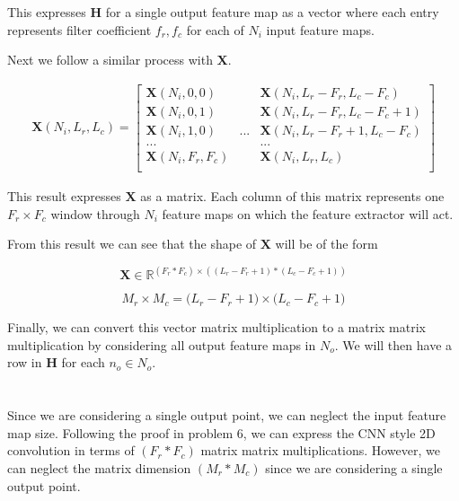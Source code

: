 \documentclass[12pt]{article}
\begin{document}
This expresses $\boldsymbol{H}$ for a single output feature map as a vector
where each entry represents filter coefficient $f_r, f_c$ for each of $N_i$
input feature maps.
\newline

Next we follow a similar process with $\boldsymbol{X}$.

\begin{align}
	\boldsymbol{X}(N_i, L_r, L_c) =
	\begin{bmatrix}
		\boldsymbol{X}(N_i, 0, 0) && \boldsymbol{X}(N_i, L_r-F_r, L_c-F_c) \\
		\boldsymbol{X}(N_i, 0, 1) && \boldsymbol{X}(N_i, L_r-F_r, L_c-F_c+1)\\
		\boldsymbol{X}(N_i, 1, 0) &...& \boldsymbol{X}(N_i, L_r-F_r+1, L_c-F_c)\\
		... && ... \\
		\boldsymbol{X}(N_i, F_r, F_c) && \boldsymbol{X}(N_i, L_r, L_c)\\
	\end{bmatrix}
\end{align}

This result expresses $\boldsymbol{X}$ as a matrix. Each column of this matrix
represents one $F_r \times F_c$ window through $N_i$ feature maps on which
the feature extractor will act.

From this result we can see that the shape of $\boldsymbol{X}$ will be of the
form

\begin{equation}
	\boldsymbol{X} \in \mathbb{R}^{(F_r*F_c)\times((L_r-F_r+1)*(L_c-F_c+1))}
\end{equation}

\begin{equation}
	M_r \times M_c = \big(L_r - F_r + 1\big) \times \big(L_c - F_c + 1 \big)
\end{equation}

Finally, we can convert this vector matrix multiplication to a matrix matrix
multiplication by considering all output feature maps in $N_o$. We will then
have a row in $\boldsymbol{H}$ for each $n_o \in N_o$.

\section{}

Since we are considering a single output point, we can neglect the input
feature map size. Following the proof in problem 6, we can express the CNN
style 2D convolution in terms of $(F_r * F_c)$ matrix matrix multiplications.
However, we can neglect the matrix dimension $(M_r * M_c)$ since we are
considering a single output point.
\end{document}
